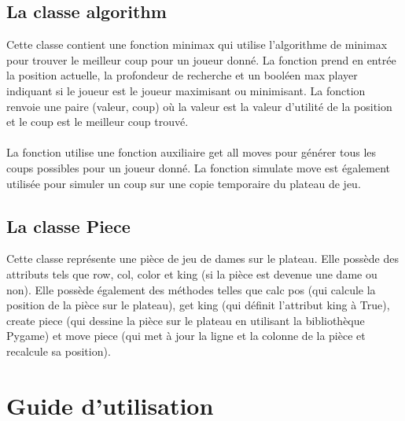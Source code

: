 \documentclass[12pt]{article}
\begin{document}
	 \subsection{La classe algorithm}
	 Cette classe contient une fonction minimax qui utilise l'algorithme de minimax pour trouver le meilleur coup pour un joueur donné. La fonction prend en entrée la position actuelle, la profondeur de recherche et un booléen max player indiquant si le joueur est le joueur maximisant ou minimisant. La fonction renvoie une paire (valeur, coup) où la valeur est la valeur d'utilité de la position et le coup est le meilleur coup trouvé.\\
	 \\
	 La fonction utilise une fonction auxiliaire get all moves pour générer tous les coups possibles pour un joueur donné. La fonction simulate move est également utilisée pour simuler un coup sur une copie temporaire du plateau de jeu.
	 \subsection{La classe Piece}
	 Cette classe représente une pièce de jeu de dames sur le plateau. Elle possède des attributs tels que row, col, color et king (si la pièce est devenue une dame ou non). Elle possède également des méthodes telles que calc pos (qui calcule la position de la pièce sur le plateau), get king (qui définit l'attribut king à True), create piece (qui dessine la pièce sur le plateau en utilisant la bibliothèque Pygame) et move piece (qui met à jour la ligne et la colonne de la pièce et recalcule sa position).
	 \section{Guide d'utilisation}
	 	
 	
\end{document}
